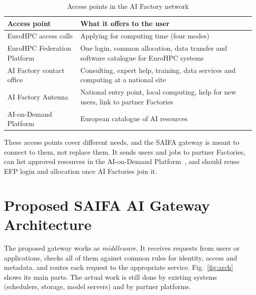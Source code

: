 \documentclass[conference,a4paper]{IEEEtran}
\DeclareRobustCommand{\chg}[1]{#1}
\DeclareRobustCommand{\roz}[1]{#1}
\DeclareRobustCommand{\nov}[1]{#1}
\begin{document}
\begin{table}[!h]
\centering
\caption{Access points in the AI Factory network}
\label{tab:landscape}
\scriptsize
\renewcommand{\arraystretch}{1.0}
\begin{tabular}{@{}>{\raggedright\arraybackslash}p{2.65cm}>{\raggedright\arraybackslash}p{5.35cm}@{}}
\toprule
\textbf{Access point} & \textbf{What it offers to the user} \\
\midrule
EuroHPC access calls & Applying for computing time (four modes) \\
EuroHPC Federation Platform & One login, common allocation, data transfer and software catalogue for EuroHPC systems \\
AI Factory contact office & Consulting, expert help, training, data services and computing at a national site \\
AI Factory Antenna & National entry point, local computing, help for new users, link to partner Factories \\
AI-on-Demand Platform & European catalogue of AI resources \\
\bottomrule
\end{tabular}
\end{table}

\chg{These access points cover different needs,} \nov{and the SAIFA gateway is meant to connect to them, not replace them. It sends users and jobs to partner Factories, can list approved resources in the AI-on-Demand Platform}~\cite{saifa_d31}\nov{, and should reuse EFP login and allocation once AI Factories join it.}

\section{\nov{Proposed SAIFA AI Gateway Architecture}}
\label{sec:model}

\nov{The proposed} gateway works as \emph{middleware}. It receives requests from users or applications, \roz{checks all of them against common rules for} identity, access and metadata, and \roz{routes} each request to the \roz{appropriate} service. \roz{Fig.~\ref{fig:arch} shows its main parts.} \nov{The actual work is still done by existing systems (schedulers, storage, model servers) and by partner platforms.}
\end{document}
